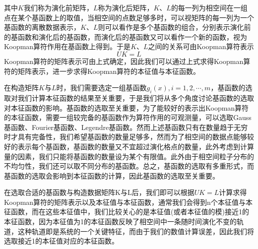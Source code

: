 其中$K$我们称为演化前矩阵，$L$称为演化后矩阵，$K$、$L$的每一列为相空间在一组点在某个基函数上的取值，当相空间的点数足够多时，可以视矩阵的每一列为一个基函数的离散数据表示，$K$、$L$则可以看作是多个基函数的组合，分别表示演化前的基函数和演化后的基函数，而演化后的基函数又可以看作一个新的函数，视为Koopman算符作用在基函数上得到。于是$K$、$L$之间的关系可由Koopman算符表示
\begin{equation}
    UK=L
\end{equation}
Koopman算符的矩阵表示可由上式确定，因此我们可以通过上式求得Koopman算符的矩阵表示，进一步求得Koopman算符的本征值与本征函数。



在构造矩阵$K$与$L$时，我们需要选定一组基函数${g_i(x)},i=1,2,\cdots,m$，基函数的选取对我们计算本征函数的结果至关重要，于是我们将从多个角度讨论基函数的选取对本征函数的影响。基函数的选取至关重要，为了能较好的表示出Koopman算符的本征函数，需要一组较完备的基函数作为算符作用的可观测量，可以选取Gauss基函数、Fourier基函数、Legendre基函数。然而上述基函数只有在数量趋于无穷时才具有完备性，我们希望基函数的数量足够多，然而为了相空间的数据点能够较好的表示每个基函数，基函数的数量又不宜超过演化格点的数量，此外考虑到计算量的因素，我们只能将基函数的数量设为某个有限值。此外由于相空间粒子分布的不均匀性，我们还可以取不同分布的基函数。总之，基函数的选取有多重形式，而基函数的选取会影响到本征函数的计算，因此基函数的选取至关重要。

在选取合适的基函数与构造数据矩阵K与L后，我们即可以根据$UK=L$计算求得Koopman算符的矩阵表示以及本征值与本征函数，通常我们会得到n个本征值与本征函数，而在这些本征值中，我们比较关心的是本征值(或者本征值的模)接近1的本征函数，因为本征值为1的本征函数反映了相空间中一条随时间演化不变的轨道，这种轨道即是系统的一个关键特征，而由于我们的数值计算误差，因此我们将选取接近1的本征值对应的本征函数。

